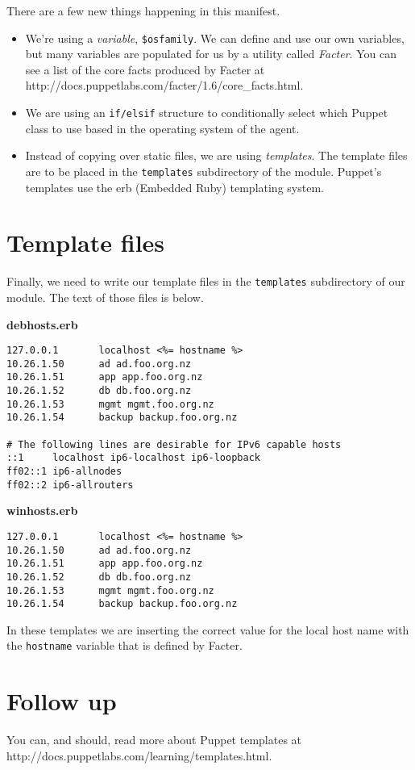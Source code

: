 \documentclass{article}   	%
\begin{document}
\newpage

There are a few new things happening in this manifest.
\begin{itemize}
  \item We're using a \emph{variable}, \texttt{\$osfamily}.  We can define and use our own variables, but many variables are populated for us by a utility called \emph{Facter}.  You can see a list of the core facts produced by Facter at \\ http://docs.puppetlabs.com/facter/1.6/core\_facts.html.
  \item We are using an \texttt{if/elsif} structure to conditionally select which Puppet class to use based in the operating system of the agent.
  \item Instead of copying over static files, we are using \emph{templates}.  The template files are to be placed in the \texttt{templates} subdirectory of the module.  Puppet's templates use the erb (Embedded Ruby) templating system.
\end{itemize}

\section{Template files}
Finally, we need to write our template files in the \texttt{templates} subdirectory of our module.  The text of those files is below.

\textbf{debhosts.erb}
\begin{verbatim}
127.0.0.1       localhost <%= hostname %>
10.26.1.50      ad ad.foo.org.nz
10.26.1.51      app app.foo.org.nz
10.26.1.52      db db.foo.org.nz
10.26.1.53      mgmt mgmt.foo.org.nz
10.26.1.54      backup backup.foo.org.nz

# The following lines are desirable for IPv6 capable hosts
::1     localhost ip6-localhost ip6-loopback
ff02::1 ip6-allnodes
ff02::2 ip6-allrouters
\end{verbatim}


\textbf{winhosts.erb}
\begin{verbatim}
127.0.0.1       localhost <%= hostname %>
10.26.1.50      ad ad.foo.org.nz
10.26.1.51      app app.foo.org.nz
10.26.1.52      db db.foo.org.nz
10.26.1.53      mgmt mgmt.foo.org.nz
10.26.1.54      backup backup.foo.org.nz

\end{verbatim}

In these templates we are inserting the correct value for the local host name with the \texttt{hostname} variable that is defined by Facter.

\section{Follow up}
You can, and should, read more about Puppet templates at http://docs.puppetlabs.com/learning/templates.html.
\end{document}
